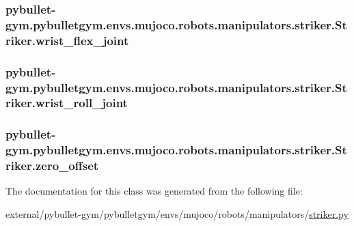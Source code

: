 \subsubsection[{\texorpdfstring{wrist\+\_\+flex\+\_\+joint}{wrist_flex_joint}}]{\setlength{\rightskip}{0pt plus 5cm}pybullet-\/gym.\+pybulletgym.\+envs.\+mujoco.\+robots.\+manipulators.\+striker.\+Striker.\+wrist\+\_\+flex\+\_\+joint}\hypertarget{classpybullet-gym_1_1pybulletgym_1_1envs_1_1mujoco_1_1robots_1_1manipulators_1_1striker_1_1_striker_a719fa25e82485d6bd3d394f0154eb19b}{}\label{classpybullet-gym_1_1pybulletgym_1_1envs_1_1mujoco_1_1robots_1_1manipulators_1_1striker_1_1_striker_a719fa25e82485d6bd3d394f0154eb19b}
\subsubsection[{\texorpdfstring{wrist\+\_\+roll\+\_\+joint}{wrist_roll_joint}}]{\setlength{\rightskip}{0pt plus 5cm}pybullet-\/gym.\+pybulletgym.\+envs.\+mujoco.\+robots.\+manipulators.\+striker.\+Striker.\+wrist\+\_\+roll\+\_\+joint}\hypertarget{classpybullet-gym_1_1pybulletgym_1_1envs_1_1mujoco_1_1robots_1_1manipulators_1_1striker_1_1_striker_ad907a5e0c2cd227a77f50f2d68e7cb0b}{}\label{classpybullet-gym_1_1pybulletgym_1_1envs_1_1mujoco_1_1robots_1_1manipulators_1_1striker_1_1_striker_ad907a5e0c2cd227a77f50f2d68e7cb0b}
\subsubsection[{\texorpdfstring{zero\+\_\+offset}{zero_offset}}]{\setlength{\rightskip}{0pt plus 5cm}pybullet-\/gym.\+pybulletgym.\+envs.\+mujoco.\+robots.\+manipulators.\+striker.\+Striker.\+zero\+\_\+offset}\hypertarget{classpybullet-gym_1_1pybulletgym_1_1envs_1_1mujoco_1_1robots_1_1manipulators_1_1striker_1_1_striker_a79e023611f3563e7994689bedc8853e3}{}\label{classpybullet-gym_1_1pybulletgym_1_1envs_1_1mujoco_1_1robots_1_1manipulators_1_1striker_1_1_striker_a79e023611f3563e7994689bedc8853e3}


The documentation for this class was generated from the following file\+:\begin{DoxyCompactItemize}
\item 
external/pybullet-\/gym/pybulletgym/envs/mujoco/robots/manipulators/\hyperlink{mujoco_2robots_2manipulators_2striker_8py}{striker.\+py}\end{DoxyCompactItemize}
